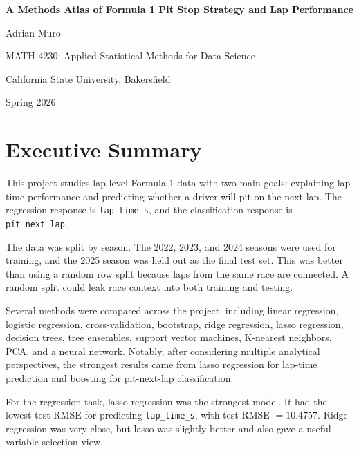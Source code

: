 \documentclass[11pt,oneside,openany]{book}
\begin{document}

\begin{titlepage}
\centering
\vspace*{1.25in}
{\Large\bfseries A Methods Atlas of Formula 1 Pit Stop Strategy and Lap Performance\par}
\vspace{0.5in}
{\large Adrian Muro\par}
\vspace{0.15in}
{MATH 4230: Applied Statistical Methods for Data Science\par}
{California State University, Bakersfield\par}
\vspace{0.25in}
{Spring 2026\par}
\vfill
\end{titlepage}

\frontmatter


\chapter*{Executive Summary}

This project studies lap-level Formula 1 data with two main goals: explaining lap time performance and predicting whether a driver will pit on the next lap. The regression response is \texttt{lap\_time\_s}, and the classification response is \texttt{pit\_next\_lap}.

The data was split by season. The 2022, 2023, and 2024 seasons were used for training, and the 2025 season was held out as the final test set. This was better than using a random row split because laps from the same race are connected. A random split could leak race context into both training and testing.

Several methods were compared across the project, including linear regression, logistic regression, cross-validation, bootstrap, ridge regression, lasso regression, decision trees, tree ensembles, support vector machines, K-nearest neighbors, PCA, and a neural network. Notably, after considering multiple analytical perspectives, the strongest results came from lasso regression for lap-time prediction and boosting for pit-next-lap classification.

For the regression task, lasso regression was the strongest model. It had the lowest test RMSE for predicting \texttt{lap\_time\_s}, with test RMSE \(=10.4757\). Ridge regression was very close, but lasso was slightly better and also gave a useful variable-selection view.
\end{document}
